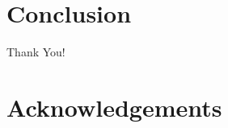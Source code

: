 \documentclass[twofold]{article}
\theoremstyle{plain}
\theoremstyle{definition}
\begin{document}




\section{Conclusion}
Thank You!

\section{Acknowledgements}
\end{document}
